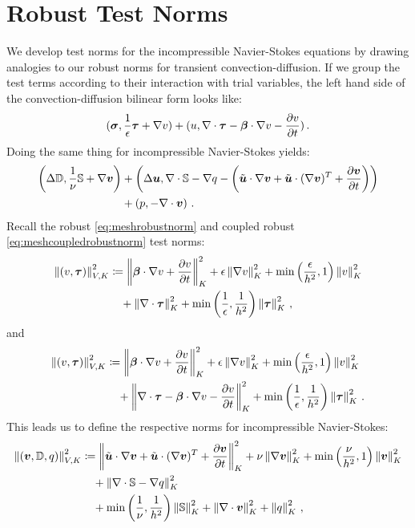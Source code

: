 \documentclass[Dissertation.tex]{subbIles}
\begin{document}
\section{Robust Test Norms}
We develop test norms for the incompressible Navier-Stokes equations by drawing analogies to our
robust norms for transient convection-diffusion. 
If we group the test terms according to their interaction with trial variables, 
the left hand side of the convection-diffusion bilinear form looks like:
\begin{equation*}
  (\boldsymbol\sigma,\frac{1}{\epsilon}\boldsymbol\tau+\nabla v)+(u,\nabla\cdot\boldsymbol\tau-\boldsymbol\beta\cdot\nabla v-\frac{\partial v}{\partial t})\,.
\end{equation*}
Doing the same thing for incompressible Navier-Stokes yields:
\begin{align*}
  \left( \Delta\mathbb{D},\frac{1}{\nu}\mathbb{S}+\nabla\boldsymbol v \right)
  &+\left( \Delta\boldsymbol u,\nabla\cdot\mathbb{S}-\nabla q-\left( \tilde{\boldsymbol u}\cdot\nabla\boldsymbol v +\tilde{\boldsymbol u}\cdot(\nabla\boldsymbol v)^T+\frac{\partial\boldsymbol v}{\partial t} \right) \right)
  \\&+\left( p,-\nabla\cdot\boldsymbol v \right)\,.
\end{align*}
Recall the robust \eqref{eq:meshrobustnorm} and coupled robust \eqref{eq:meshcoupledrobustnorm} test norms:
\begin{align*}
\left\| \left( v,\boldsymbol\tau \right) \right\|_{V,K}^2 &\coloneqq
\left\| \boldsymbol\beta\cdot\nabla v+\frac{\partial v}{\partial t} \right\|_K^2
+ \epsilon\left\| \nabla v \right\|_K^2
+ \min\left( \frac{\epsilon}{h^2},1 \right)\left\| v \right\|^2_K
\\\nonumber&\quad
+ \left\| \nabla\cdot \boldsymbol\tau \right\|_K^2
+ \min\left( \frac{1}{\epsilon},\frac{1}{h^2} \right)\left\| \boldsymbol\tau \right\|_K^2\,,
\end{align*}
and
\begin{align*}
\left\| \left( v,\boldsymbol\tau \right) \right\|_{V,K}^2 &\coloneqq
\left\| \boldsymbol\beta\cdot\nabla v+\frac{\partial v}{\partial t} \right\|_K^2
+ \epsilon\left\| \nabla v \right\|_K^2
+ \min\left( \frac{\epsilon}{h^2},1 \right)\left\| v \right\|^2_K
\\\nonumber&\quad
+ \left\| \nabla\cdot \boldsymbol\tau - \boldsymbol\beta\cdot\nabla v-\frac{\partial v}{\partial t} \right\|_K^2
+ \min\left( \frac{1}{\epsilon},\frac{1}{h^2} \right)\left\| \boldsymbol\tau \right\|_K^2\,.
\end{align*}
This leads us to define the respective norms for incompressible Navier-Stokes:
\begin{align*}
\left\| \left( \boldsymbol v,\mathbb{D},q \right) \right\|_{V,K}^2 &\coloneqq
\left\| \tilde{\boldsymbol u}\cdot\nabla\boldsymbol v +\tilde{\boldsymbol u}\cdot(\nabla\boldsymbol v)^T+\frac{\partial\boldsymbol v}{\partial t} \right\|_K^2
+ \nu\left\| \nabla\boldsymbol v \right\|_K^2
+ \min\left( \frac{\nu}{h^2},1 \right)\left\| \boldsymbol v \right\|^2_K
\\\nonumber&\quad
+ \left\| \nabla\cdot\mathbb{S}-\nabla q \right\|_K^2
\\\nonumber&\quad
+ \min\left( \frac{1}{\nu},\frac{1}{h^2} \right)\left\| \mathbb{S} \right\|_K^2
+\left\| \nabla\cdot\boldsymbol v \right\|_K^2
+\left\| q \right\|_K^2
\,,
\end{align*}
\end{document}
